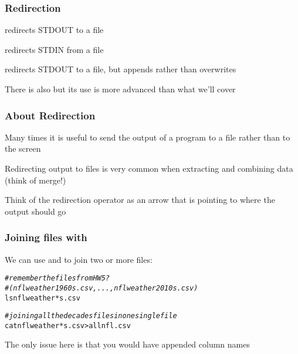 \documentclass[12pt]{beamer}\usepackage[]{graphicx}\usepackage[]{color}
\makeatletter
\newcommand{\hlcom}[1]{\textcolor[rgb]{0.678,0.584,0.686}{\textit{#1}}}%
\newenvironment{kframe}{%
 \def\at@end@of@kframe{}%
 \ifinner\ifhmode%
  \def\at@end@of@kframe{\end{minipage}}%
  \begin{minipage}{\columnwidth}%
 \fi\fi%
 \def\FrameCommand##1{\hskip\@totalleftmargin \hskip-\fboxsep
 \colorbox{shadecolor}{##1}\hskip-\fboxsep
     \hskip-\linewidth \hskip-\@totalleftmargin \hskip\columnwidth}%
 \MakeFramed {\advance\hsize-\width
   \@totalleftmargin\z@ \linewidth\hsize
   \@setminipage}}%
 {\par\unskip\endMakeFramed%
 \at@end@of@kframe}
\newenvironment{knitrout}{}{} %
\makeatother
\begin{document}

\begin{frame}
\frametitle{Redirection}

\bbi
  \item[] {\hilit \code{>}} redirects STDOUT to a file
  \item[] {\hilit \code{<}} redirects STDIN from a file
  \item[] {\hilit \code{>>}} redirects STDOUT to a file, but appends rather than overwrites
  \item[] There is also {\hilit \code{<<}} but its use is more advanced than what we'll cover
\ei

\end{frame}


\begin{frame}
\frametitle{About Redirection}

\bbi
  \item Many times it is useful to send the output of a program to a file rather than to the screen
  \item Redirecting output to files is very common when extracting and combining data (think of merge!)
  \item Think of the redirection operator  as an arrow that is pointing to where the output should go
\ei

\end{frame}


\begin{frame}[fragile]
\frametitle{Joining files with }

We can use {\hilit {}} and {\hilit \code{>}} to join two or more files:
\begin{knitrout}\footnotesize
{}\color{fgcolor}\begin{kframe}
\begin{alltt}
\hlcom{# remember the files from HW5?}
\hlcom{# (nflweather1960s.csv, ..., nflweather2010s.csv)}
ls nflweather*s.csv

\hlcom{# joining all the decades files in one single file}
cat nflweather*s.csv > allnfl.csv
\end{alltt}
\end{kframe}
\end{knitrout}

{\footnotesize The only issue here is that you would have appended column names}

\end{frame}
\end{document}
